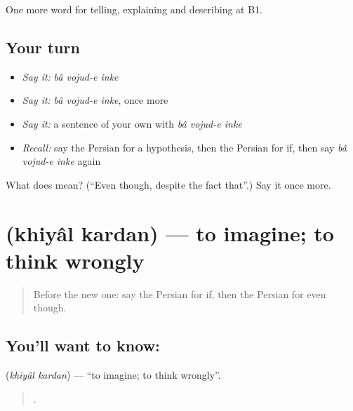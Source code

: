 \begin{grammarlens}[title={What you've built}]
One more word for telling, explaining and describing at B1.
\end{grammarlens}

\subsection*{Your turn}
\begin{itemize}
\raggedright
  \item \emph{Say it:} \emph{bâ vojud-e inke}
  \item \emph{Say it:} \emph{bâ vojud-e inke}, once more
  \item \emph{Say it:} a sentence of your own with \emph{bâ vojud-e inke}
  \item \emph{Recall:} say the Persian for a hypothesis, then the Persian for if, then say \emph{bâ vojud-e inke} again
\end{itemize}

\begin{tcolorbox}[breakable,colback=teal!4,colframe=teal!35!black,title={Before you move on}]
What does    mean? (\textquotedblleft{}Even though, despite the fact that\textquotedblright{}.) Say it once more.
\end{tcolorbox}
\section[\texorpdfstring{\fa{خیال} \fa{کردن} (khiyâl kardan)}{خیال کردن (khiyâl kardan)}]{  (khiyâl kardan) — to imagine; to think wrongly}

\label{lesson:FA-C391-khiyal-kardan}



\begin{quote}
Before the new one: say the Persian for if, then the Persian for even though.
\end{quote}

\subsection*{You'll want to know:  }
\textbf{ } (\emph{khiyâl kardan}) — \textquotedblleft{}to imagine; to think wrongly\textquotedblright{}.

\begin{quote}
       .
\end{quote}

